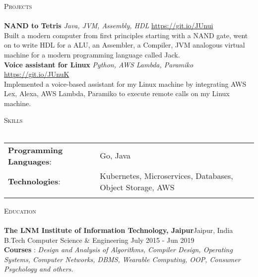 \documentclass[a4paper]{article}
\newcommand{\lineunder} {
    \vspace*{-8pt} \\
    \hspace*{-18pt} \hrulefill \\
}
\newcommand{\header} [1] {
    {\hspace*{-18pt}\vspace*{6pt} \textsc{#1}}
    \vspace*{-6pt} \lineunder
}
\begin{document}
\header{Projects}
\vspace*{2mm}
{\textbf{NAND to Tetris}} {\sl Java, JVM, Assembly, HDL} \hfill \href{https://git.io/JUnui}{https://git.io/JUnui}  \\
Built a modern computer from first principles starting with a NAND gate, went on to write HDL for a ALU, an Assembler, a Compiler, JVM analogous virtual machine for a modern programming language called Jack.\\
\vspace*{2mm}
{\textbf{Voice assistant for Linux}} {\sl Python, AWS Lambda, Paramiko} \hfill \href{https://git.io/JUnuK}{https://git.io/JUnuK}\\
Implemented a voice-based assistant for my Linux machine by integrating AWS Lex, Alexa, AWS Lambda, Paramiko to execute remote calls on my Linux machine.\\
\vspace*{2mm}
\vspace*{2mm}

\header{Skills}
\vspace{2mm}
\begin{tabular}{ ll}
	\textbf{Programming Languages}: & Go, Java\\
	\textbf{Technologies}:           & Kubernetes, Microservices, Databases, Object Storage, AWS  \\
	\vspace{1mm}
\end{tabular}

\header{Education}
\textbf{The LNM Institute of Information Technology, Jaipur}\hfill Jaipur, India\\
B.Tech Computer Science \& Engineering \hfill July 2015 - Jun 2019\\
	\vspace{2mm}
\textbf{Courses} : 
\textit{Design and Analysis of Algorithms, Compiler Design, Operating Systems, Computer Networks, DBMS, Wearable Computing, OOP, Consumer Psychology and others.}
\vspace{2mm}


\vspace*{2mm}

\ 
\end{document}
